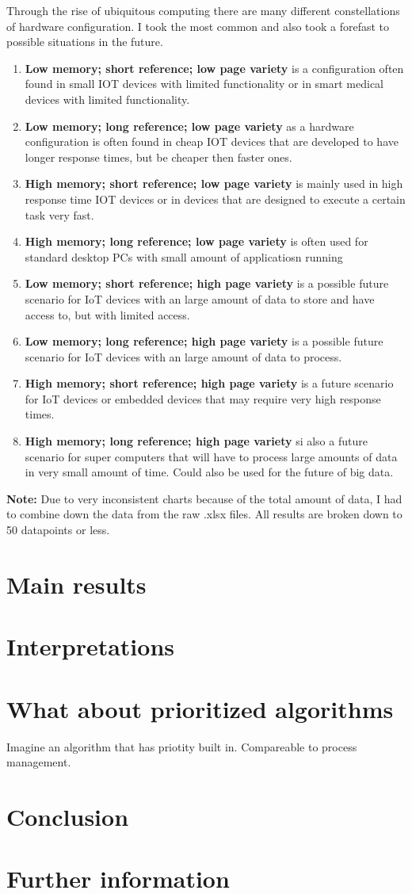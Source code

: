 \documentclass[12pt, reqno]{amsart}
\numberwithin{equation}{section}
\begin{document}
Through the rise of ubiquitous computing there are many different constellations of hardware configuration.
I took the most common and also took a forefast to possible situations in the future.
\begin{enumerate}
    \item \textbf{Low memory; short reference; low page variety} is a configuration often found in small IOT devices 
    with limited functionality or in smart medical devices with limited functionality.
    \item \textbf{Low memory; long reference; low page variety} as a hardware configuration is often found in cheap IOT devices 
    that are developed to have longer response times, but be cheaper then faster ones.
    \item \textbf{High memory; short reference; low page variety} is mainly used in high response time
    IOT devices or in devices that are designed to execute a certain task very fast.
    \item \textbf{High memory; long reference; low page variety} is often used for standard desktop PCs with small amount of applicatiosn running
    \item \textbf{Low memory; short reference; high page variety} is a possible future scenario for IoT devices with an large amount of data to store and have access to, but with
    limited access.
    \item \textbf{Low memory; long reference; high page variety} is a possible future scenario for IoT devices with an large amount of
    data to process.
    \item \textbf{High memory; short reference; high page variety} is a future scenario for IoT devices or embedded devices that
    may require very high response times.
    \item \textbf{High memory; long reference; high page variety} si also a future scenario for super computers that will have to
    process large amounts of data in very small amount of time. Could also be used for the future of big data.
\end{enumerate} 

\textbf{Note:} Due to very inconsistent charts because of the total amount of data, I had to combine down the data from the raw .xlsx files. All results are broken down
to 50 datapoints or less.


\section{Main results}


\section{Interpretations}

\section{What about prioritized algorithms}
Imagine an algorithm that has priotity built in. Compareable to process management.

\section{Conclusion}

\section{Further information}
\end{document}
